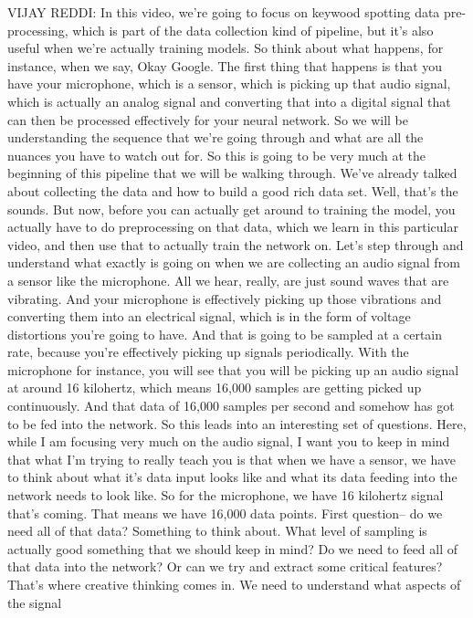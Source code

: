 VIJAY REDDI: In this video, we're going to focus on keywood spotting data
pre-processing, which is part of the data collection kind of pipeline,
but it's also useful when we're actually training models.
So think about what happens, for instance, when we say, Okay Google.
The first thing that happens is that you have your microphone, which
is a sensor, which is picking up that audio signal, which is actually
an analog signal and converting that into a digital signal that can then
be processed effectively for your neural network.
So we will be understanding the sequence that we're going through
and what are all the nuances you have to watch out for.
So this is going to be very much at the beginning of this pipeline
that we will be walking through.
We've already talked about collecting the data
and how to build a good rich data set.
Well, that's the sounds.
But now, before you can actually get around to training the model,
you actually have to do preprocessing on that data, which
we learn in this particular video, and then use
that to actually train the network on.
Let's step through and understand what exactly
is going on when we are collecting an audio signal
from a sensor like the microphone.
All we hear, really, are just sound waves that are vibrating.
And your microphone is effectively picking up those vibrations
and converting them into an electrical signal, which
is in the form of voltage distortions you're going to have.
And that is going to be sampled at a certain rate,
because you're effectively picking up signals periodically.
With the microphone for instance, you will
see that you will be picking up an audio signal at around 16 kilohertz, which
means 16,000 samples are getting picked up continuously.
And that data of 16,000 samples per second and somehow
has got to be fed into the network.
So this leads into an interesting set of questions.
Here, while I am focusing very much on the audio signal,
I want you to keep in mind that what I'm trying to really teach you
is that when we have a sensor, we have to think about what it's data
input looks like and what its data feeding into the network
needs to look like.
So for the microphone, we have 16 kilohertz signal that's coming.
That means we have 16,000 data points.
First question-- do we need all of that data?
Something to think about.
What level of sampling is actually good something that we should keep in mind?
Do we need to feed all of that data into the network?
Or can we try and extract some critical features?
That's where creative thinking comes in.
We need to understand what aspects of the signal
